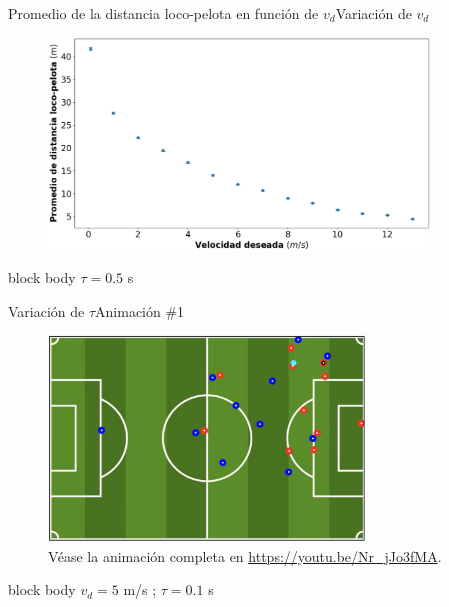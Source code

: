 \documentclass{beamer}
\begin{document}
            \begin{frame}{Promedio de la distancia loco-pelota en función de $v_d$}{Variación de $v_d$}
                \begin{figure}[H!]
                    \includegraphics[width=0.9\textwidth]{./distancia_vs_vd}
                    \label{fig:futbol_5}
                \end{figure}
                \begin{beamercolorbox}[sep=5pt,center]{block body}
                    \centering
                    \small{$\tau = 0.5$ s}
                \end{beamercolorbox}
            \end{frame}

            \begin{frame}{Variación de $\tau$}{Animación \#1}
                \vspace*{-0.3cm}
                \begin{figure}[H!]
                    \includegraphics[width=0.75\textwidth]{./animacion_4}
                    \caption*{Véase la animación completa en \url{https://youtu.be/Nr_jJo3fMA}.}
                    \label{fig:futbol_6}
                \end{figure}
                \vspace*{-0.5cm}
                \begin{beamercolorbox}[sep=5pt,center]{block body}
                    \centering
                    \small{$v_d = 5$ m/s ; $\tau = 0.1$ s}
                \end{beamercolorbox}
            \end{frame}
\end{document}
